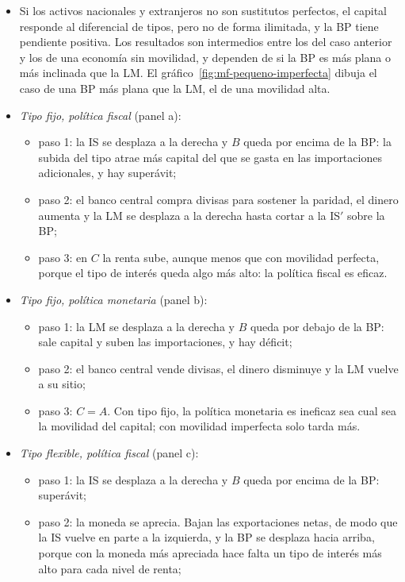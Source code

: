 \documentclass[11pt]{article}
\begin{document}
\begin{itemize}
\item Si los activos nacionales y extranjeros no son sustitutos perfectos, el capital responde al diferencial de tipos, pero no de forma ilimitada, y la BP tiene pendiente positiva. Los resultados son intermedios entre los del caso anterior y los de una economía sin movilidad, y dependen de si la BP es más plana o más inclinada que la LM. El gráfico~\ref{fig:mf-pequeno-imperfecta} dibuja el caso de una BP más plana que la LM, el de una movilidad alta.
\item \emph{Tipo fijo, política fiscal} (panel a):
  \begin{itemize}
  \item paso 1: la IS se desplaza a la derecha y $B$ queda por encima de la BP: la subida del tipo atrae más capital del que se gasta en las importaciones adicionales, y hay superávit;
  \item paso 2: el banco central compra divisas para sostener la paridad, el dinero aumenta y la LM se desplaza a la derecha hasta cortar a la IS$'$ sobre la BP;
  \item paso 3: en $C$ la renta sube, aunque menos que con movilidad perfecta, porque el tipo de interés queda algo más alto: la política fiscal es eficaz.
  \end{itemize}
\item \emph{Tipo fijo, política monetaria} (panel b):
  \begin{itemize}
  \item paso 1: la LM se desplaza a la derecha y $B$ queda por debajo de la BP: sale capital y suben las importaciones, y hay déficit;
  \item paso 2: el banco central vende divisas, el dinero disminuye y la LM vuelve a su sitio;
  \item paso 3: $C=A$. Con tipo fijo, la política monetaria es ineficaz sea cual sea la movilidad del capital; con movilidad imperfecta solo tarda más.
  \end{itemize}
\item \emph{Tipo flexible, política fiscal} (panel c):
  \begin{itemize}
  \item paso 1: la IS se desplaza a la derecha y $B$ queda por encima de la BP: superávit;
  \item paso 2: la moneda se aprecia. Bajan las exportaciones netas, de modo que la IS vuelve en parte a la izquierda, y la BP se desplaza hacia arriba, porque con la moneda más apreciada hace falta un tipo de interés más alto para cada nivel de renta;

\end{itemize}
\end{itemize}
\end{document}
